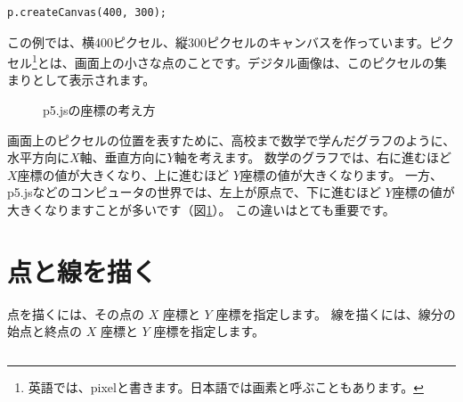 \begin{listing}[htbp]
\begin{verbatim}
p.createCanvas(400, 300);
\end{verbatim}
\caption{幅400、高さ300のキャンバスを作る}
\label{lst:chapter02-create-canvas}
\end{listing}

この例では、横400ピクセル、縦300ピクセルのキャンバスを作っています。ピクセル\footnote{英語では、pixelと書きます。日本語では画素と呼ぶこともあります。}とは、画面上の小さな点のことです。デジタル画像は、このピクセルの集まりとして表示されます。

\begin{figure}[htbp]
    \centering
    \caption{p5.jsの座標の考え方}
    \label{fig:chapter02-coordinate-system}
\end{figure}

画面上のピクセルの位置を表すために、高校まで数学で学んだグラフのように、水平方向に$X$軸、垂直方向に$Y$軸を考えます。
数学のグラフでは、右に進むほど $X$座標の値が大きくなり、上に進むほど $Y$座標の値が大きくなります。
一方、p5.jsなどのコンピュータの世界では、左上が原点で、下に進むほど $Y$座標の値が大きくなりますことが多いです（図\ref{fig:chapter02-coordinate-system}）。
この違いはとても重要です。

\section{点と線を描く}
\label{sec:points-and-lines}

点を描くには、その点の $X$ 座標と $Y$ 座標を指定します。
線を描くには、線分の始点と終点の $X$ 座標と $Y$ 座標を指定します。

\begin{listing}[htbp]
\inputminted{ts}{typescript-p5/listings/chapter02/points-and-lines.ts}
\caption{点と線を描く（\texttt{chapter02/points-and-lines.ts}）}
\label{lst:chapter02-points-and-lines}
\end{listing}


